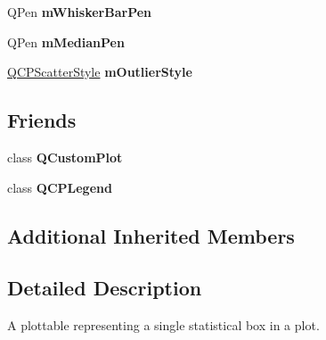 \begin{DoxyCompactItemize}
\item 
\mbox{\label{class_q_c_p_statistical_box_aa719b1d722a9f82364df1497a6dc1da8}} 
Q\+Pen {\bfseries m\+Whisker\+Bar\+Pen}
\item 
\mbox{\label{class_q_c_p_statistical_box_a1af5b601049c575f778ae270f40c9443}} 
Q\+Pen {\bfseries m\+Median\+Pen}
\item 
\mbox{\label{class_q_c_p_statistical_box_ae102e4187e1e6ba1f2df0f622b5171a4}} 
\hyperlink{class_q_c_p_scatter_style}{Q\+C\+P\+Scatter\+Style} {\bfseries m\+Outlier\+Style}
\end{DoxyCompactItemize}
\subsection*{Friends}
\begin{DoxyCompactItemize}
\item 
\mbox{\label{class_q_c_p_statistical_box_a1cdf9df76adcfae45261690aa0ca2198}} 
class {\bfseries Q\+Custom\+Plot}
\item 
\mbox{\label{class_q_c_p_statistical_box_a8429035e7adfbd7f05805a6530ad5e3b}} 
class {\bfseries Q\+C\+P\+Legend}
\end{DoxyCompactItemize}
\subsection*{Additional Inherited Members}


\subsection{Detailed Description}
A plottable representing a single statistical box in a plot. 



